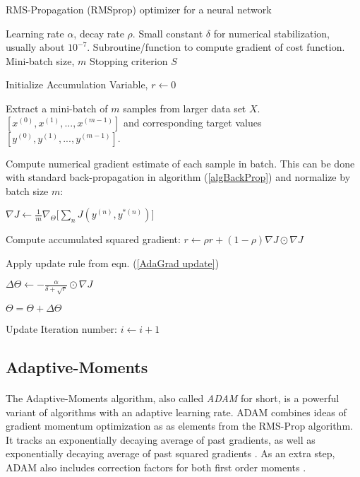 \documentclass[12pt,letterpaper]{article}
\begin{document}
\begin{algorithm}[H]
\caption{RMS-Propagation (RMSprop) optimizer for a neural network}
\label{algAdaGrad}

\begin{algorithmic}

\REQUIRE Learning rate $\alpha$, decay rate $\rho$.
\REQUIRE Small constant $\delta$ for numerical stabilization, usually about $10^{-7}$.
\REQUIRE Subroutine/function to compute gradient of cost function.
\REQUIRE Mini-batch size, $m$
\REQUIRE Stopping criterion $S$

Initialize Accumulation Variable, $r \leftarrow 0$

	\item Extract a mini-batch of $m$ samples from larger data set $X$. $[x^{(0)},x^{(1)},...,x^{(m-1)}]$ and corresponding target values 
	$[y^{(0)},y^{(1)},...,y^{(m-1)}]$.
	\item Compute numerical gradient estimate of each sample in batch. This can be done with standard back-propagation in algorithm (\ref{algBackProp}) and 			 	normalize by batch size $m$:
	\item $\nabla J \leftarrow \frac{1}{m}\nabla_{\Theta} \Big[ \sum_n J(y^{(n)},y^{*(n)}) \Big] $
	\item Compute accumulated squared gradient: $r \leftarrow \rho r + (1 - \rho) \nabla J \odot \nabla J$
	\item Apply update rule from eqn. (\ref{AdaGrad update})
	\item $\Delta \Theta \leftarrow -\frac{\alpha}{\delta+\sqrt{r}} \odot \nabla J$
	\item $\Theta = \Theta + \Delta \Theta$	
	\item Update Iteration number: $i \leftarrow i + 1$
\ENDWHILE

\end{algorithmic}
\end{algorithm}




\newpage

\subsection{Adaptive-Moments}

\paragraph*{}The Adaptive-Moments algorithm, also called \textit{ADAM} for short, is a powerful variant of algorithms with an adaptive learning rate. ADAM combines ideas of gradient momentum optimization as as elements from the RMS-Prop algorithm. It tracks an exponentially decaying average of past gradients, as well as exponentially decaying average of past squared gradients \cite{Geron}. As an extra step, ADAM also includes correction factors for both first order moments \cite{Goodfellow}.
\end{document}
